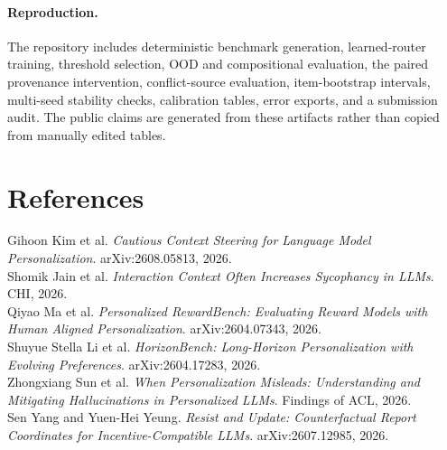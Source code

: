 \documentclass[10pt,twocolumn]{article}
\begin{document}
\paragraph{Reproduction.} The repository includes deterministic benchmark generation, learned-router training, threshold selection, OOD and compositional evaluation, the paired provenance intervention, conflict-source evaluation, item-bootstrap intervals, multi-seed stability checks, calibration tables, error exports, and a submission audit. The public claims are generated from these artifacts rather than copied from manually edited tables.

\section*{References}\small
Gihoon Kim et al. \emph{Cautious Context Steering for Language Model Personalization}. arXiv:2608.05813, 2026.\\
Shomik Jain et al. \emph{Interaction Context Often Increases Sycophancy in LLMs}. CHI, 2026.\\
Qiyao Ma et al. \emph{Personalized RewardBench: Evaluating Reward Models with Human Aligned Personalization}. arXiv:2604.07343, 2026.\\
Shuyue Stella Li et al. \emph{HorizonBench: Long-Horizon Personalization with Evolving Preferences}. arXiv:2604.17283, 2026.\\
Zhongxiang Sun et al. \emph{When Personalization Misleads: Understanding and Mitigating Hallucinations in Personalized LLMs}. Findings of ACL, 2026.\\
Sen Yang and Yuen-Hei Yeung. \emph{Resist and Update: Counterfactual Report Coordinates for Incentive-Compatible LLMs}. arXiv:2607.12985, 2026.
\end{document}
